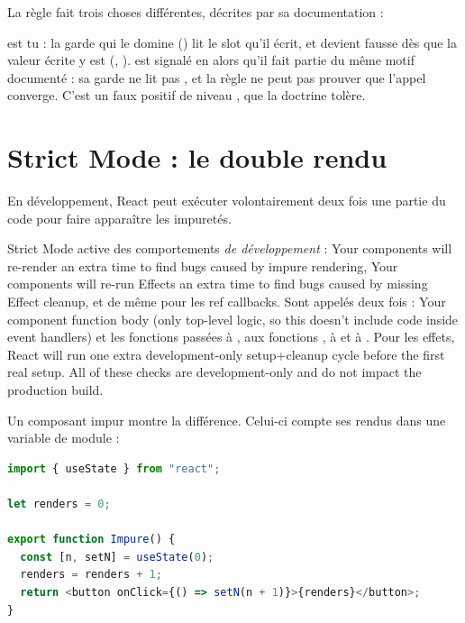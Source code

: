 La règle fait trois choses différentes, décrites par sa documentation :


 est tu : la garde qui le domine () lit le slot qu'il écrit, et devient fausse dès que la valeur écrite
y est (, ).
 est signalé en \Warning{} alors qu'il fait partie du
même motif documenté : sa garde ne lit pas , et la règle ne
peut pas prouver que l'appel converge. C'est un faux positif de niveau
\Warning, que la doctrine tolère.

\section{Strict Mode : le double rendu}
\label{sec:react-modele-strictmode}

En développement, React peut exécuter volontairement deux fois une partie du
code pour faire apparaître les impuretés.

\begin{react}
Strict Mode active des comportements \emph{de développement} : \og Your
components will re-render an extra time to find bugs caused by impure
rendering\fg{}, \og Your components will re-run Effects an extra time to find
bugs caused by missing Effect cleanup\fg{}, et de même pour les ref callbacks.
Sont appelés deux fois : \og Your component function body (only top-level
logic, so this doesn't include code inside event handlers)\fg{} et les fonctions
passées à , aux fonctions , à  et à
. Pour les effets, \og React will run one extra
development-only setup+cleanup cycle before the first real setup\fg{}.
\og All of these checks are development-only and do not impact the production
build.\fg{} \cite{ReactDocs}
\end{react}

Un composant impur montre la différence. Celui-ci compte ses rendus dans une
variable de module :

\begin{lstlisting}[language=TypeScript,caption={\code{Impure} : le rendu modifie une variable de module (\file{/tmp/ch02/strict.tsx})},label={lst:react-modele-impure}]
import { useState } from "react";

let renders = 0;

export function Impure() {
  const [n, setN] = useState(0);
  renders = renders + 1;
  return <button onClick={() => setN(n + 1)}>{renders}</button>;
}
\end{lstlisting}

